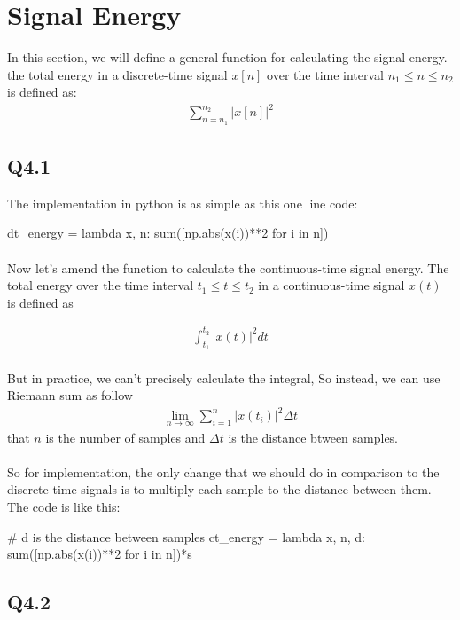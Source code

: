 \section{Signal Energy}
In this section, we will define a general 
function for calculating the signal energy. 
the total energy in a discrete-time signal 
$x[n]$ over the time interval $n_1 \leq n \leq n_2$ 
is defined as:
\begin{align}
\sum_{n=n_1}^{n_2} |x[n]|^2
\end{align}
\subsection{Q4.1}
The implementation in python is as simple 
as this one line code:

\begin{python}
dt_energy = lambda x, n: sum([np.abs(x(i))**2 for i in n])
\end{python}

\paragraph{}Now let's amend the function to calculate 
the continuous-time signal energy. The total energy 
over the time interval $t_1 \leq t \leq t_2$ in a 
continuous-time signal $x(t)$ is defined as

\begin{align}
\int_{t_1}^{t_2} |x(t)|^2dt
\end{align}
\paragraph{}But in practice, we can't precisely 
calculate the integral, So instead, we can use Riemann sum as follow
\begin{align}
\mathop {\lim }\limits_{n \to \infty } \sum\limits_{i = 1}^n {|x\left( {t_i} \right)|^2\Delta t}
\end{align}
that $n$ is the number of samples and $\Delta t$ is the distance btween samples.

\paragraph{}So for implementation, the only change that 
we should do in comparison to the discrete-time signals 
is to multiply each sample to the distance between them. 
The code is like this:

\begin{python}
# d is the distance between samples
ct_energy = lambda x, n, d: sum([np.abs(x(i))**2 for i in n])*s
\end{python}

\subsection{Q4.2}
 




